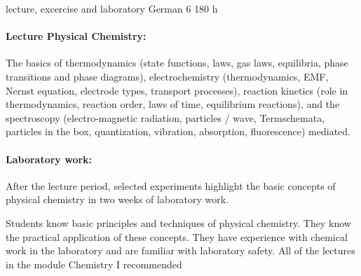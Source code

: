 {lecture, excercise and laboratory}
{German}
{6}
{180 h}
{\paragraph{Lecture Physical Chemistry:} The basics of thermodynamics (state functions, laws, gas laws, equilibria, phase transitions and phase diagrams), electrochemistry (thermodynamics, EMF, Nernst equation, electrode types, transport processes), reaction kinetics (role in thermodynamics, reaction order, laws of time, equilibrium reactions), and the spectroscopy (electro-magnetic radiation, particles / wave, Termschemata, particles in the box, quantization, vibration, absorption, fluorescence) mediated.  \paragraph{Laboratory work:} After the lecture period, selected experiments highlight the basic concepts of physical chemistry in two weeks of laboratory work.}
{Students know basic principles and techniques of physical chemistry. They know the practical application of these concepts. They have experience with chemical work in the laboratory and are familiar with laboratory safety.}
{All of the lectures in the module Chemistry I recommended}